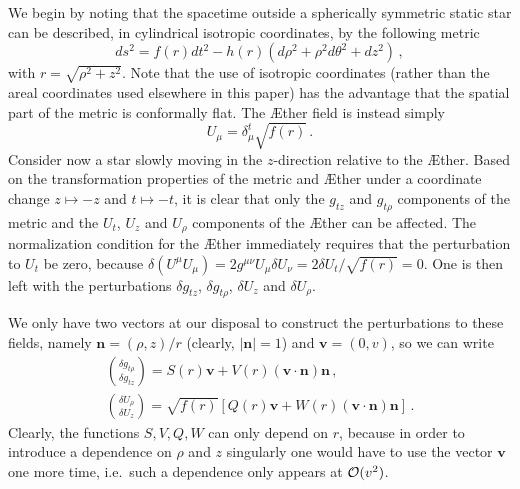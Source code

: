 \documentclass[prd,aps,twocolumn,nofootinbib,showpacs,superscriptaddress]{revtex4-1}
\newcommand\be{\begin{equation}}
\newcommand\ee{\end{equation}}
\begin{document}
We begin by noting that the spacetime outside a spherically symmetric
static star can be described, in cylindrical isotropic coordinates, by
the following metric
%
\be ds^2 = f(r) dt^2 - h(r) (d\rho^2 + \rho^2 d\theta^2+dz^2)\,,  \ee
%
with $r=\sqrt{\rho^2+z^2}$. Note that the use of isotropic coordinates
(rather than the areal coordinates used elsewhere in this paper) has
the advantage that the spatial part of the metric is conformally
flat. The \AE ther field is instead simply
%
\be U_\mu = \delta_\mu^t \sqrt{f(r)} \,.  \ee
%
Consider now a star slowly moving in the $z$-direction relative to the
\AE ther. Based on the transformation properties of the metric and
\AE ther under a coordinate change $z\mapsto-z$ and $t\mapsto-t$,
it is clear that only
the $g_{tz}$ and $g_{t\rho}$ components of the metric and the $U_t$,
$U_z$ and $U_{\rho}$ components of the \AE ther can be affected. The
normalization condition for the \AE ther immediately requires that the
perturbation to $U_t$ be zero, because $\delta (U^\mu U_\mu) = 2
g^{\mu\nu} U_\mu \delta U_\nu= 2 \delta U_t/\sqrt{f(r)}=0$. One is
then left with the perturbations $\delta g_{tz}$, $\delta g_{t\rho}$,
$\delta U_z$ and $\delta U_{\rho}$.

We only have two vectors at our disposal to construct the
perturbations to these fields, namely $\boldsymbol{n}=(\rho,z)/r$
(clearly, $|\boldsymbol{n}|=1$) and $\boldsymbol{v}=(0,v)$, so
 we can write 
%
\begin{gather}
\label{ansatz1}
\binom {\delta g_{t\rho}} {\delta g_{tz}} = S(r) \boldsymbol{v}+ V(r)
(\boldsymbol{v}\cdot \boldsymbol{n}) \boldsymbol{n}\,,\\ \binom {\delta
  U_{\rho}} {\delta U_{z}} = \sqrt{f(r)} \left[Q(r) \boldsymbol{v}+
  W(r) (\boldsymbol{v}\cdot \boldsymbol{n})
  \boldsymbol{n}\right]\,.\label{ansatz2}
\end{gather}
%
Clearly, the functions $S,V,Q,W$ can only depend on $r$, because in
order to introduce a dependence on $\rho$ and $z$ singularly one would
have to use the vector $\boldsymbol{v}$ one more time, i.e.~such a
dependence only appears at ${\cal O} (v^2)$.
\end{document}
